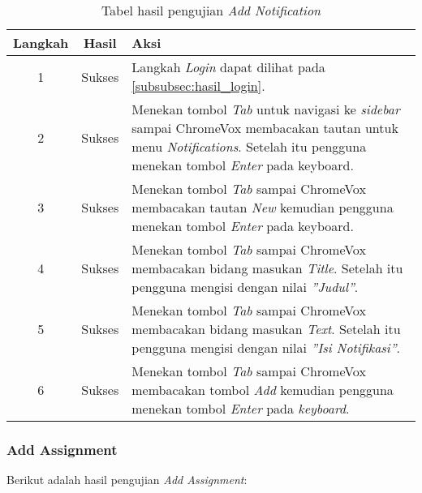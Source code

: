 \begin{table}[H]
	\centering
	\caption{Tabel hasil pengujian \textit{Add Notification}}
	\label{tab:hasil_add_notification}
	\begin{tabular}{|c|c|p{12cm}|}
		\toprule
		Langkah & Hasil & Aksi\\
		\midrule
		1 & Sukses & Langkah \textit{Login} dapat dilihat pada \ref{subsubsec:hasil_login}.\\
		2 & Sukses & Menekan tombol \textit{Tab} untuk navigasi ke \textit{sidebar} sampai ChromeVox membacakan tautan untuk menu \textit{Notifications}. Setelah itu pengguna menekan tombol \textit{Enter} pada keyboard.\\
		3 & Sukses & Menekan tombol \textit{Tab} sampai ChromeVox membacakan tautan \textit{New} kemudian pengguna menekan tombol \textit{Enter} pada keyboard.\\
		4 & Sukses & Menekan tombol \textit{Tab} sampai ChromeVox membacakan bidang masukan \textit{Title}. Setelah itu pengguna mengisi dengan nilai \textit{''Judul''}.\\
		5 & Sukses & Menekan tombol \textit{Tab} sampai ChromeVox membacakan bidang masukan \textit{Text}. Setelah itu pengguna mengisi dengan nilai \textit{''Isi Notifikasi''}.\\
		6 & Sukses & Menekan tombol \textit{Tab} sampai ChromeVox membacakan tombol \textit{Add} kemudian pengguna menekan tombol \textit{Enter} pada \textit{keyboard}.\\
		\bottomrule
	\end{tabular}
\end{table}

\subsubsection{Add Assignment}
\label{subsubsec:hasil_add_assignment}
Berikut adalah hasil pengujian \textit{Add Assignment}:


